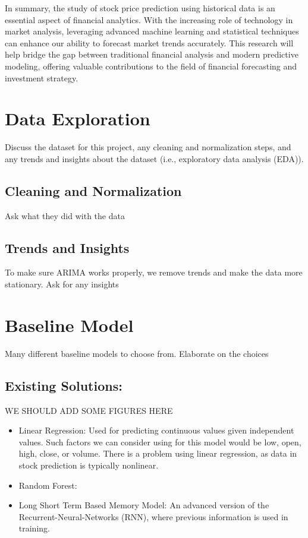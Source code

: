 \documentclass[conference]{IEEEtran}
\begin{document}
In summary, the study of stock price prediction using historical data is an essential aspect of financial analytics. With the increasing role of technology in market analysis, leveraging advanced machine learning and statistical techniques can enhance our ability to forecast market trends accurately. This research will help bridge the gap between traditional financial analysis and modern predictive modeling, offering valuable contributions to the field of financial forecasting and investment strategy.


\section{Data Exploration}

 Discuss the dataset for this project, any cleaning and normalization steps, and any trends and insights about the dataset (i.e., exploratory data analysis (EDA)).

 \subsection{Cleaning and Normalization}
Ask what they did with the data


 \subsection{Trends and Insights}
 To make sure ARIMA works properly, we remove trends and make the data more stationary.
 Ask for any insights

\section{Baseline Model}

Many different baseline models to choose from.  Elaborate on the choices

\subsection{Existing Solutions: }

WE SHOULD ADD SOME FIGURES HERE

\begin{itemize}
\item{Linear Regression: }
Used for predicting continuous values given independent values.  Such factors we can consider using for this model would be low, open, high, close, or volume.  There is a problem using linear regression, as data in stock prediction is typically nonlinear.

\item{Random Forest: }


\item{Long Short Term Based Memory Model: }
An advanced version of the Recurrent-Neural-Networks (RNN), where previous information is used in training.  
\end{itemize}
\end{document}
